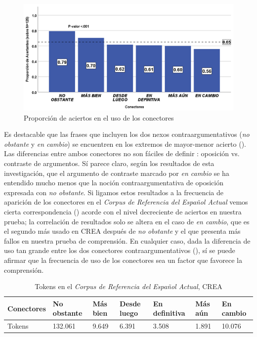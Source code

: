 \documentclass[spanish]{textolivre}
\begin{document}
\begin{figure}[htbp]
\centering
\begin{minipage}{.8\textwidth}
 \includegraphics[width=\textwidth]{Fig1.png}
 \caption{Proporción de aciertos en el uso de los conectores}
 \label{fig1}
\end{minipage}
\end{figure}

Es destacable que las frases que incluyen los dos nexos contraargumentativos (\emph{no obstante} y \emph{en cambio}) se encuentren en los extremos de mayor-menor acierto (). Las diferencias entre ambos conectores no son fáciles de definir \cite{marchante2021}: oposición vs. contraste de argumentos. Sí parece claro, según los resultados de esta investigación, que el argumento de contraste marcado por \textit{en cambio} se ha entendido mucho menos que la noción contraargumentativa de oposición expresada con \textit{no obstante}. Si ligamos estos resultados a la frecuencia de aparición de los conectores en el \emph{Corpus de Referencia del Español Actual} \cite{realacademia} vemos cierta correspondencia () acorde con el nivel decreciente de aciertos en nuestra prueba; la correlación de resultados solo se altera en el caso de \textit{en cambio}, que es el segundo más usado en CREA después de \textit{no obstante} y el que presenta más fallos en nuestra prueba de comprensión. En cualquier caso, dada la diferencia de uso tan grande entre los dos conectores contraargumentativos (), sí se puede afirmar que la frecuencia de uso de los conectores sea un factor que favorece la comprensión.


\begin{table}[h!]
\centering
\begin{threeparttable}
\caption{Tokens en el \emph{Corpus de Referencia del Español Actual}, CREA}
\label{tab2}
\begin{tabular}{lllllll}
\toprule
Conectores & No obstante & Más bien & Desde luego & En definitiva & Más aún & En cambio \\
\midrule
Tokens & 132.061 & 9.649 & 6.391 & 3.508 & 1.891 & 10.076 \\
\bottomrule
\end{tabular}
\end{threeparttable}
\end{table}
\end{document}
